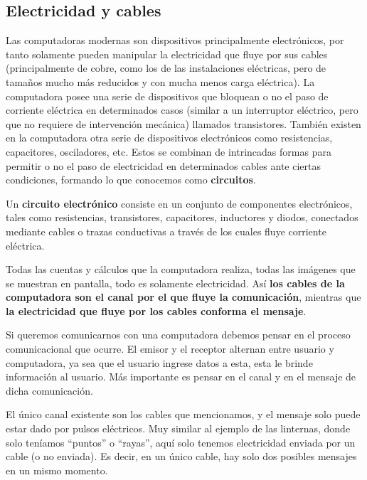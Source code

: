 \subsection{Electricidad y cables}

Las computadoras modernas son dispositivos principalmente electrónicos, por tanto
solamente pueden manipular la electricidad que fluye por sus cables (principalmente de
cobre, como los de las instalaciones eléctricas, pero de tamaños mucho más
reducidos y con mucha menos carga eléctrica). La computadora posee una serie de
dispositivos que bloquean o no el paso de corriente eléctrica en determinados
casos (similar a un interruptor eléctrico, pero que no requiere de intervención
mecánica) llamados transistores. También existen en la computadora otra serie de 
dispositivos electrónicos como resistencias, capacitores, osciladores, etc.
Estos se combinan de intrincadas formas para permitir o no el paso de electricidad
en determinados cables ante ciertas condiciones, formando lo que conocemos como
\textbf{circuitos}.

\begin{definition}
    Un \textbf{circuito electrónico} consiste en un conjunto de componentes
    electrónicos, tales como resistencias, transistores, capacitores, inductores
    y diodos, conectados mediante cables o trazas conductivas a través de los
    cuales fluye corriente eléctrica.
\end{definition}

Todas las cuentas y cálculos que la computadora realiza, todas las imágenes que
se muestran en pantalla, todo es solamente electricidad. Así \textbf{los cables
de la computadora son el canal por el que fluye la comunicación}, mientras que
\textbf{la electricidad que fluye por los cables conforma el mensaje}.

Si queremos comunicarnos con una computadora debemos pensar en el proceso
comunicacional que ocurre. El emisor y el receptor alternan entre usuario y
computadora, ya sea que el usuario ingrese datos a esta, esta le brinde
información al usuario. Más importante es pensar en el canal y en el mensaje de
dicha comunicación.

El único canal existente son los cables que mencionamos, y el mensaje solo puede
estar dado por pulsos eléctricos. Muy similar al ejemplo de las linternas, donde
solo teníamos ``puntos'' o ``rayas'', aquí solo tenemos electricidad enviada por
un cable (o no enviada). Es decir, en un único cable, hay solo dos posibles
mensajes en un mismo momento.


